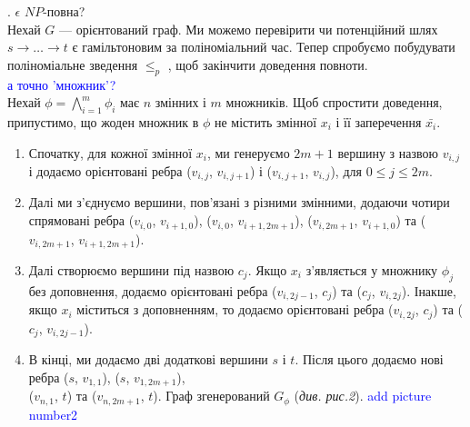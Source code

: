 \documentclass[14pt]{article}
\begin{document}
\begin{spacing}{1.175}
    . \dhampath \(\epsilon\) \(NP\)-повна?\\
    Нехай \(G\) — орієнтований граф. Ми можемо перевірити чи потенційний шлях \(s \to \dots \to t\) є гамільтоновим за поліноміальний час. Тепер спробуємо побудувати поліноміальне зведення \tsat \(\le_p\) \dhampath, щоб закінчити доведення повноти.
    \\
    \textcolor{blue}{а точно 'множник'?}\\
    Нехай \(\phi = \bigwedge_{i=1}^{m} \phi_{i}\) має \(n\) змінних і \(m\) множників. Щоб спростити доведення, припустимо, що жоден множник в \(\phi\) не містить змінної \(x_i\) і її заперечення \(\bar{x_i}\).  
    
    \begin{enumerate}
        \item  Спочатку, для кожної змінної \(x_i\), ми генеруємо \(2m+1\) вершину з назвою \(v_{i,j}\) і додаємо орієнтовані ребра (\(v_{i,j}\), \(v_{i,j+1}\)) і (\(v_{i,j+1}\), \(v_{i,j}\)), для \(0 \le j \le 2m\).
        
        \item  Далі ми з’єднуємо вершини, пов’язані з різними змінними, додаючи чотири спрямовані ребра (\(v_{i,0}\), \(v_{i+1,0}\)), (\(v_{i,0}\), \(v_{i+1,2m+1}\)), (\(v_{i,2m+1}\), \(v_{i+1,0}\)) та (\(v_{i,2m+1}\), \(v_{i+1,2m+1}\)).
        
        \item  Далі створюємо вершини під назвою \(c_{j}\). Якщо \(x_i\) з'являється у множнику \(\phi_{j}\) без доповнення, додаємо орієнтовані ребра
        (\(v_{i,2j-1}\), \(c_{j}\)) та (\(c_{j}\), \(v_{i,2j}\)). Інакше, якщо \(x_i\) міститься з доповненням, то додаємо орієнтовані ребра (\(v_{i,2j}\), \(c_{j}\)) та (\(c_{j}\), \(v_{i,2j-1}\)).
        
        \item В кінці, ми додаємо дві додаткові вершини \(s\) і \(t\). Після цього додаємо нові ребра (\(s\), \(v_{1,1}\)), (\(s\), \(v_{1,2m+1}\)), \\(\(v_{n,1}\), \(t\)) та (\(v_{n,2m+1}\), \(t\)). Граф згенерований \(G_{\phi}\) (\textit{див. рис.2}). \textcolor{blue}{add picture number2}        
    \end{enumerate}
    \\
    

\end{spacing}
\end{document}
